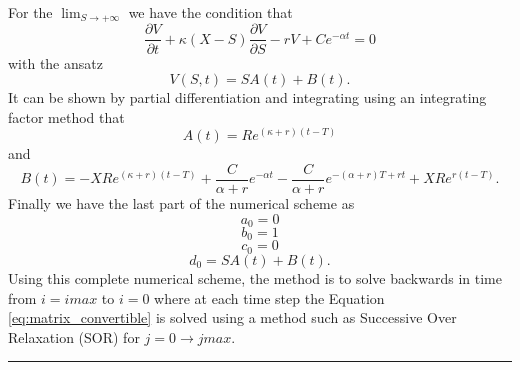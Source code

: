 \documentclass{article}
\begin{document}
For the \({\lim}_{S \to +\infty}\) we have the condition that
\begin{equation}
  \frac{\partial V}{\partial t} +\kappa(X -S)\frac{\partial V}{\partial S} -rV + Ce^{-\alpha t} =0
  \label{eq:large_s_boundary}
\end{equation}
with the ansatz
\begin{equation}
  V(S,t)=SA(t)+B(t).
  \label{eq:ansatz}
\end{equation}
It can be shown by partial differentiation and integrating using an integrating factor method that
\begin{equation}
  A(t)=Re^{(\kappa+r)(t-T)}
  \label{eq:A}
\end{equation}
and\begin{equation}
  B(t)=-XRe^{(\kappa+r)(t-T)}+\frac{C}{\alpha+r}e^{-\alpha t}-\frac{C}{\alpha+r}e^{-(\alpha+r)T+rt}+XRe^{r(t-T)}.
  \label{eq:B}
\end{equation}
Finally we have the last part of the numerical scheme as
\begin{equation}
  a_0 = 0
  \label{eq:amax}
\end{equation}
\begin{equation}
  b_0 = 1
  \label{eq:bmax}
\end{equation}
\begin{equation}
  c_0 =0
  \label{eq:cmax}
\end{equation}
\begin{equation}
  d_0 = SA(t)+B(t).
  \label{eq:dmax}
\end{equation}
Using this complete numerical scheme, the method is to solve backwards in time from $i=imax$ to $i=0$ where at each time step the Equation \ref{eq:matrix_convertible} is solved using
a method such as Successive Over Relaxation (SOR) for $j=0\to jmax$.
\par\noindent\rule{\textwidth}{0.4pt}
\end{document}
